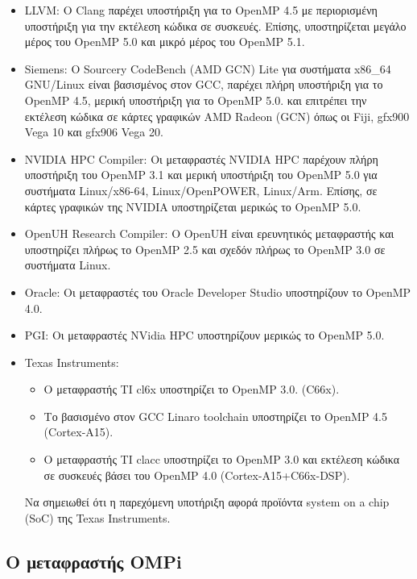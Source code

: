 \begin{itemize}
	\item LLVM: Ο Clang παρέχει υποστήριξη για το OpenMP 4.5 με περιορισμένη υποστήριξη για την εκτέλεση κώδικα σε συσκευές. Επίσης, υποστηρίζεται μεγάλο μέρος του OpenMP 5.0 και μικρό μέρος του OpenMP 5.1.
	\item Siemens: Ο Sourcery CodeBench (AMD GCN) Lite για συστήματα x86\_64 GNU/Linux είναι βασισμένος στον GCC, παρέχει πλήρη υποστήριξη για το OpenMP 4.5, μερική υποστήριξη για το OpenMP 5.0. και επιτρέπει την εκτέλεση κώδικα σε κάρτες γραφικών AMD Radeon (GCN) όπως οι Fiji, gfx900 Vega 10 και gfx906 Vega 20.	
	\item NVIDIA HPC Compiler: Οι μεταφραστές NVIDIA HPC παρέχουν πλήρη υποστήριξη του OpenMP 3.1 και μερική υποστήριξη του OpenMP 5.0 για συστήματα Linux/x86-64, Linux/OpenPOWER, Linux/Arm. Επίσης, σε κάρτες γραφικών της NVIDIA υποστηρίζεται μερικώς το OpenMP 5.0.
	\item OpenUH Research Compiler: Ο OpenUH είναι ερευνητικός μεταφραστής και υποστηρίζει πλήρως το OpenMP 2.5 και σχεδόν πλήρως το OpenMP 3.0 σε συστήματα Linux.
	\item Oracle: Οι μεταφραστές του Oracle Developer Studio υποστηρίζουν το OpenMP 4.0.
	\item PGI: Οι μεταφραστές NVidia HPC υποστηρίζουν μερικώς το OpenMP 5.0.
	\item Texas Instruments:
		\begin{itemize}
			\item Ο μεταφραστής TI cl6x υποστηρίζει το OpenMP 3.0. (C66x).
			\item Το βασισμένο στον GCC Linaro toolchain υποστηρίζει το OpenMP 4.5 (Cortex-A15).
			\item Ο μεταφραστής TI clacc υποστηρίζει το OpenMP 3.0 και εκτέλεση κώδικα σε συσκευές βάσει του OpenMP 4.0 (Cortex-A15+C66x-DSP).
		\end{itemize}
		Να σημειωθεί ότι η παρεχόμενη υποτήριξη αφορά προϊόντα system on a chip (SoC) της Texas Instruments.
\end{itemize}

\subsection{Ο μεταφραστής OMPi}

